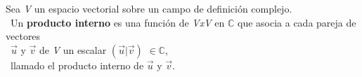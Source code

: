 \documentclass[preview]{standalone}
\begin{document}
\begin{center}
Sea \textit{V} un espacio vectorial sobre un campo de definición complejo. \\\ Un \textbf{producto interno} es una función de \textit{VxV} en $\mathbb{C}$ que asocia a cada pareja de vectores \\\ $\vec{u}$ y $\vec{v}$ de \textit{V} un escalar $(\vec{u} | \vec{v})$ $\in \mathbb{C}$, \\\ llamado el producto interno de  $\vec{u}$ y $\vec{v}$.
\end{center}
\end{document}
